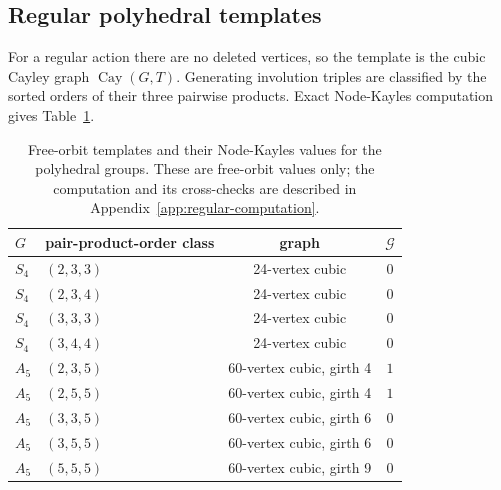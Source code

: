 \documentclass[11pt]{article}
\theoremstyle{definition}
\theoremstyle{remark}
\newcommand{\Grundy}{\mathcal{G}}
\DeclareMathOperator{\Aut}{Aut}
\DeclareMathOperator{\Cay}{Cay}
\newif\ifdraftnotes
\newcommand{\phasenote}[2]{%
  \ifdraftnotes
    \par\smallskip\noindent
    \fbox{\parbox{0.96\linewidth}{\footnotesize\textbf{[#1 owed]}\ #2}}%
    \par\smallskip
  \fi}
\begin{document}
\phasenote{C307}{This section is the structural placeholder for the promoted polyhedral content.
Per Fable's change~4 it must \emph{lead with completeness} --- the C284 classification theorem that
all admissible $S_4/A_5$ coset templates are tabulated, with $A_4$ impossible --- and then present
the $A_5$ $(3,5,5;\rho=3/5)$ split as the load-bearing refinement, proved as an $\Aut(G)$-orbit
invariant (C289) with no stronger geometric interpretation. The ten-row
$(\sigma,\rho,\text{class size},t_1\ldots t_5)$ table belongs here in the body; edge lists and
replay counts go to Appendix~\ref{app:evidence} (Fable's answer~4). C289's mirror lemma upgrades six
$t_1=0$ entries from computed to proved; the $\rho=3$ regular zero stays computational and must be
visibly marked as such. The free-orbit table below is the only polyhedral material the source
manuscript carries and is retained here unchanged pending that integration.}

\subsection{Regular polyhedral templates}

For a regular action there are no deleted vertices, so the template is the cubic Cayley graph
$\Cay(G,T)$. Generating involution triples are classified by the sorted orders of their three
pairwise products. Exact Node-Kayles computation gives Table~\ref{tab:polyhedral-regular}.

\begin{table}[H]
\centering
\begin{tabular}{llcc}
\toprule
$G$ & pair-product-order class & graph & $\Grundy$\\
\midrule
$S_4$ & $(2,3,3)$ & 24-vertex cubic & $0$\\
$S_4$ & $(2,3,4)$ & 24-vertex cubic & $0$\\
$S_4$ & $(3,3,3)$ & 24-vertex cubic & $0$\\
$S_4$ & $(3,4,4)$ & 24-vertex cubic & $0$\\
$A_5$ & $(2,3,5)$ & 60-vertex cubic, girth 4 & $1$\\
$A_5$ & $(2,5,5)$ & 60-vertex cubic, girth 4 & $1$\\
$A_5$ & $(3,3,5)$ & 60-vertex cubic, girth 6 & $0$\\
$A_5$ & $(3,5,5)$ & 60-vertex cubic, girth 6 & $0$\\
$A_5$ & $(5,5,5)$ & 60-vertex cubic, girth 9 & $0$\\
\bottomrule
\end{tabular}
\caption{Free-orbit templates and their Node-Kayles values for the polyhedral groups. These are
free-orbit values only; the computation and its cross-checks are described in
Appendix~\ref{app:regular-computation}.}
\label{tab:polyhedral-regular}
\end{table}
\end{document}
